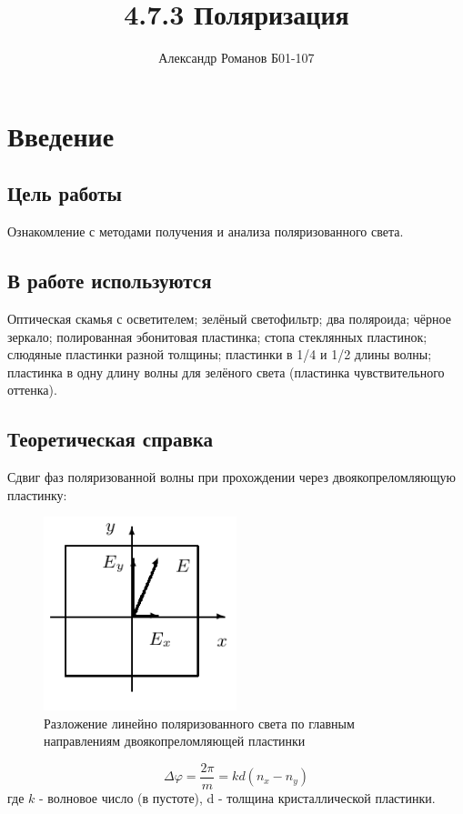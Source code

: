 \documentclass{article}
\author{Александр Романов Б01-107}
\date{}
\title{4.7.3 Поляризация}
\begin{document}
\maketitle
\section{Введение}

\subsection{Цель работы}
Ознакомление с методами получения и анализа поляризованного света.
\subsection{В работе используются}
Оптическая скамья с осветителем; зелёный светофильтр; два поляроида; чёрное зеркало; полированная эбонитовая
пластинка; стопа стеклянных пластинок; слюдяные пластинки разной толщины; пластинки в 1/4 и 1/2 длины волны;
пластинка в одну длину волны для зелёного света (пластинка чувствительного оттенка).
\subsection{Теоретическая справка}
Сдвиг фаз поляризованной волны при прохождении через двоякопреломляющую пластинку:

\begin{figure}[H]
    \centering
    \includegraphics[width=0.5\textwidth]{polarized-decomposition.png}
    \caption{Разложение линейно поляризованного света по главным направлениям
    двоякопреломляющей пластинки}
\end{figure} 

\[ \Delta\varphi = \frac{2\pi}{m} = kd\left(n_x - n_y\right) \]
где \(k\) - волновое число (в пустоте), d - толщина кристаллической пластинки.
\end{document}
